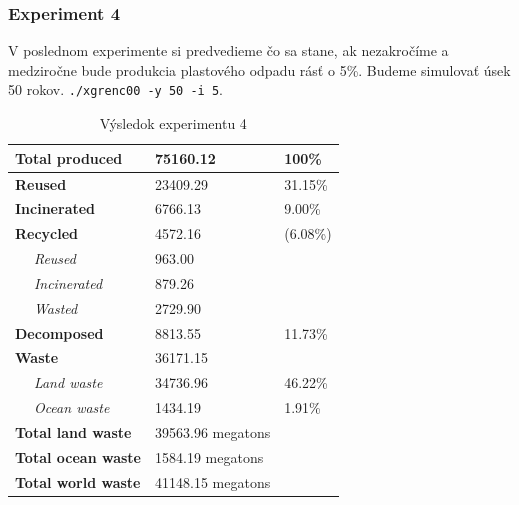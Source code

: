 \documentclass[a4paper, 11pt]{article}
\begin{document}
\subsubsection{Experiment 4}
\label{label:exp4}

V poslednom experimente si predvedieme čo sa stane, ak nezakročíme a medziročne bude produkcia plastového odpadu rásť o 5\%. Budeme simulovať úsek 50 rokov.
\texttt{./xgrenc00 -y 50 -i 5}.

\begin{table}[ht]
	\centering
	\begin{tabular}{|l|l|l|l|}
		\hline
		\multicolumn{2}{|l|}{\textbf{Total produced}}    & 75160.12             & 100\%              \\ \hline
		\multicolumn{2}{|l|}{\textbf{Reused}}            & 23409.29             & 31.15\%            \\ \hline
		\multicolumn{2}{|l|}{\textbf{Incinerated}}       & 6766.13              & 9.00\%             \\ \hline
		\multicolumn{2}{|l|}{\textbf{Recycled}}          & 4572.16              & (6.08\%)           \\ \hline
		                                                 & \textit{Reused}      & 963.00   &         \\ \hline
		                                                 & \textit{Incinerated} & 879.26   &         \\ \hline
		                                                 & \textit{Wasted}      & 2729.90  &         \\ \hline
		\multicolumn{2}{|l|}{\textbf{Decomposed}}        & 8813.55              & 11.73\%            \\ \hline
		\multicolumn{2}{|l|}{\textbf{Waste}}             & 36171.15             &                    \\ \hline
		                                                 & \textit{Land waste}  & 34736.96 & 46.22\% \\ \hline
		                                                 & \textit{Ocean waste} & 1434.19  & 1.91\%  \\ \hline
		\multicolumn{2}{|l|}{\textbf{Total land waste}}  & 39563.96 megatons    &                    \\ \hline
		\multicolumn{2}{|l|}{\textbf{Total ocean waste}} & 1584.19 megatons     &                    \\ \hline
		\multicolumn{2}{|l|}{\textbf{Total world waste}} & 41148.15 megatons    &                    \\ \hline
	\end{tabular}
	\caption{Výsledok experimentu 4}
	\label{tab:6}
\end{table}
\end{document}
